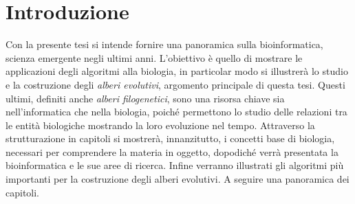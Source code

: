 \chapter*{Introduzione}
 
Con la presente tesi si intende fornire una panoramica sulla bioinformatica, scienza emergente negli ultimi anni. L'obiettivo è quello di mostrare le applicazioni degli algoritmi alla biologia, in particolar modo si illustrerà lo studio e la costruzione degli \textit{alberi evolutivi}, argomento principale di questa tesi.
\newline
Questi ultimi, definiti anche \textit{alberi filogenetici}, sono una risorsa chiave sia nell'informatica che nella biologia, poiché permettono lo studio delle relazioni tra le entità biologiche mostrando la loro evoluzione nel tempo.
\newline 
 Attraverso la strutturazione in capitoli si mostrerà, innanzitutto, i concetti base di biologia, necessari per comprendere la materia in oggetto, dopodiché verrà presentata la bioinformatica e le sue aree di ricerca. Infine verranno illustrati gli algoritmi più importanti per la costruzione degli alberi evolutivi. A seguire una panoramica dei capitoli.
